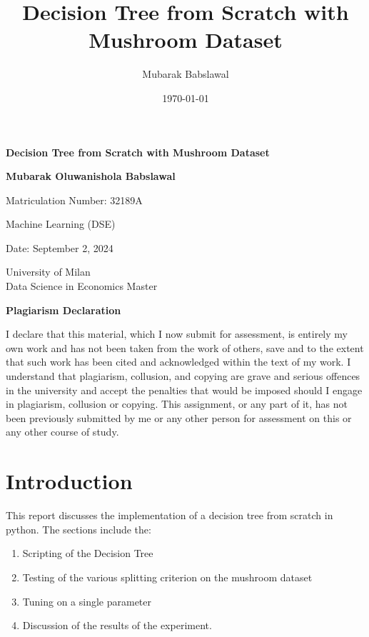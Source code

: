 \documentclass{article}
\title{Decision Tree from Scratch with Mushroom Dataset}
\author{Mubarak Babslawal}
\date{\today}
\begin{document}
\begin{titlepage}
    \centering
    \vspace*{2cm}

    \Huge
    \textbf{Decision Tree from Scratch with Mushroom Dataset}

    \vspace{1.5cm}
    
    \LARGE
    \textbf{Mubarak Oluwanishola Babslawal}
    
    \vspace{0.5cm}
    \Large
    Matriculation Number: 32189A

    \vfill
    
    \Large
    Machine Learning (DSE)
    
    \vspace{0.8cm}
    
    \Large
    Date: September 2, 2024
    
    \vspace{1cm}

    \Large
    University of Milan\\
    Data Science in Economics Master

\end{titlepage}

\newpage
\thispagestyle{empty}

\begin{center}
    \huge
    \textbf{Plagiarism Declaration}
\end{center}

\vspace{1.5cm}

\noindent


    \Large
    I declare that this material, which I now submit for assessment, is entirely my own work and has not been taken from the work of others, save and to the extent that such work has been cited and acknowledged within the text of my work. I understand that plagiarism, collusion, and copying are grave and serious offences in the university and accept the penalties that would be imposed should I engage in plagiarism, collusion or copying. This assignment, or any part of it, has not been previously submitted by me or any other person for assessment on this or any other course of study.
\newpage

\large

\section{Introduction}
This report discusses the implementation of a decision tree from scratch in python. The sections include the:
\begin{enumerate}[label=\roman*.]
    \item Scripting of the Decision Tree
    \item Testing of the various splitting criterion on the mushroom dataset 
    \item Tuning on a single parameter 
    \item Discussion of the results of the experiment.
\end{enumerate}
\end{document}
